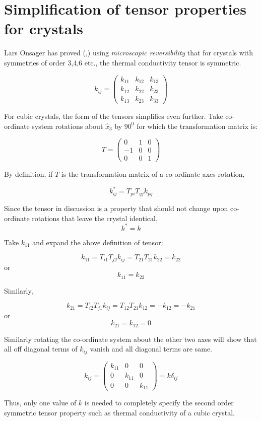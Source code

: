 \section{Simplification of tensor properties for crystals}
\label{cubicsimplify}

Lars Onsager has proved (\cite{onsager1},\cite{onsager2}) using {\em microscopic reversibility} that for crystals with symmetries of order 3,4,6 etc., the thermal conductivity tensor is symmetric.

\begin{equation}
k_{ij} = \left(
\begin{array}{lll}
k_{11} & k_{12} & k_{13} \\
k_{12} & k_{22} & k_{23} \\
k_{13} & k_{23} & k_{33}
\end{array}
\right)
\end{equation}

For cubic crystals, the form of the tensors simplifies even further. Take co-ordinate system rotations about $\hat{x}_3$ by $90^0$ for which the transformation matrix is:

\begin{equation}
T = \left(
\begin{array}{lll}
0 & 1 & 0 \\
-1 & 0 & 0 \\
0 & 0 & 1
\end{array}
\right) 
\end{equation}


By definition, if $T$ is the transformation matrix of a co-ordinate axes rotation,

$$ k_{ij}^* = T_{pi} T_{qj} k_{pq} $$

Since the tensor in discussion is a property that should not change upon co-ordinate rotations that leave the crystal identical,
$$ k^* = k$$

Take $k_{11}$ and expand the above definition of tensor:

$$k_{11} = T_{i1}T_{j2}k_{ij} = T_{21}T_{21}k_{22} = k_{22}$$
or
$$k_{11} = k_{22}$$

Similarly,

$$k_{21} = T_{i2}T_{j1}k_{ij} = T_{12}T_{21}k_{12} = -k_{12} = -k_{21}$$
or
$$k_{21} = k_{12} = 0$$

Similarly rotating the co-ordinate system about the other two axes will show that all off diagonal terms of $k_{ij}$ vanish and all diagonal terms are same.

\begin{equation}
k_{ij} = \left(
\begin{array}{lll}
k_{11} & 0 & 0 \\
0 & k_{11} & 0 \\
0 & 0 & k_{11}
\end{array}
\right) = k \delta_{ij}
\end{equation}

Thus, only one value of $k$ is needed to completely specify the second order symmetric tensor property such as thermal conductivity of a cubic crystal.


